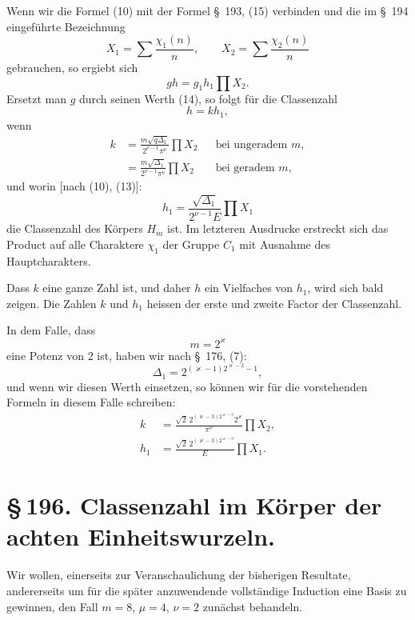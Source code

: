 \documentclass[11pt]{article}
\begin{document}
Wenn wir die Formel (10) mit der Formel \S~193, (15) verbinden und die im \S~194 eingeführte Bezeichnung
\[
X_1=\sum\frac{\chi_1(n)}{n},
\qquad
X_2=\sum\frac{\chi_2(n)}{n}
\]
gebrauchen, so ergiebt sich
\[
gh=g_1h_1\prod X_2.
\]
Ersetzt man $g$ durch seinen Werth (14), so folgt für die Classenzahl
\begin{equation}
h=kh_1,
\tag{15}
\end{equation}
wenn
\begin{equation}
\begin{aligned}
k&=\frac{m\sqrt{q\Delta_1}}{2^{\nu-1}\pi^\nu}\prod X_2 &&\text{bei ungeradem }m,\\
&=\frac{m\sqrt{\Delta_1}}{2^{\nu-1}\pi^\nu}\prod X_2 &&\text{bei geradem }m,
\end{aligned}
\tag{16}
\end{equation}
und worin [nach (10), (13)]:
\begin{equation}
h_1=\frac{\sqrt{\Delta_1}}{2^{\nu-1}E}\prod X_1
\tag{17}
\end{equation}
die Classenzahl des Körpers $H_m$ ist. Im letzteren Ausdrucke erstreckt sich das Product auf alle Charaktere $\chi_1$ der Gruppe $C_1$ mit Ausnahme des Hauptcharakters.

Dass $k$ eine ganze Zahl ist, und daher $h$ ein Vielfaches von $h_1$, wird sich bald zeigen. Die Zahlen $k$ und $h_1$ heissen der erste und zweite Factor der Classenzahl.

In dem Falle, dass
\[
m=2^\varkappa
\]
eine Potenz von 2 ist, haben wir nach \S~176, (7):
\[
\Delta_1=2^{(\varkappa-1)2^{\varkappa-2}-1},
\]
und wenn wir diesen Werth einsetzen, so können wir für die vorstehenden Formeln in diesem Falle schreiben:
\begin{equation}
\begin{aligned}
k&=\frac{\sqrt2\,2^{(\varkappa-3)2^{\varkappa-3}}2^\varkappa}{\pi^\nu}\prod X_2,\\
h_1&=\frac{\sqrt2\,2^{(\varkappa-3)2^{\varkappa-3}}}{E}\prod X_1.
\end{aligned}
\tag{18}
\end{equation}

\section*{\S\,196. Classenzahl im Körper der achten Einheitswurzeln.}

Wir wollen, einerseits zur Veranschaulichung der bisherigen Resultate, andererseits um für die später anzuwendende vollständige Induction eine Basis zu gewinnen, den Fall $m=8$, $\mu=4$, $\nu=2$ zunächst behandeln.
\end{document}
